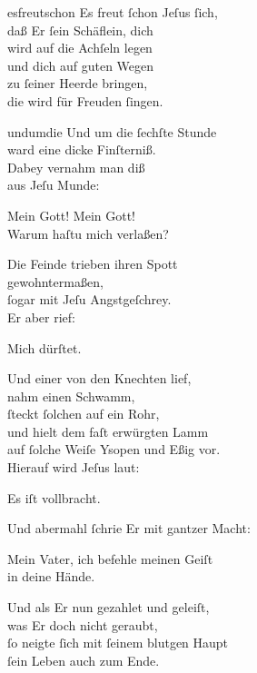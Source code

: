 \documentclass[tocstyle=ref-genre]{ees}
\begin{document}
{\begin{movement}{esfreutschon}
  \voice[Coro]
  Es freut ſchon Jeſus ſich,\\
  daß Er ſein Schäflein, dich\\
  wird auf die Achſeln legen\\
  und dich auf guten Wegen\\
  zu ſeiner Heerde bringen,\\
  die wird für Freuden ſingen.
\end{movement}

\begin{movement}{undumdie}
  Und um die ſechſte Stunde\\
  ward eine dicke Finſterniß.\\
  Dabey vernahm man diß\\
  aus Jeſu Munde:

  Mein Gott! Mein Gott!\\
  Warum haſtu mich verlaßen?

  Die Feinde trieben ihren Spott\\
  gewohntermaßen,\\
  ſogar mit Jeſu Angstgeſchrey.\\
  Er aber rief:

  Mich dürſtet.

  Und einer von den Knechten lief,\\
  nahm einen Schwamm,\\
  ſteckt ſolchen auf ein Rohr,\\
  und hielt dem faſt erwürgten Lamm\\
  auf ſolche Weiſe Ysopen und Eßig vor.\\
  Hierauf wird Jeſus laut:

  Es iſt vollbracht.

  Und abermahl ſchrie Er mit gantzer Macht:

  Mein Vater, ich befehle meinen Geiſt\\
  in deine Hände.

  Und als Er nun gezahlet und geleiſt,\\
  was Er doch nicht geraubt,\\
  ſo neigte ſich mit ſeinem blutgen Haupt\\
  ſein Leben auch zum Ende.
\end{movement}

}
\end{document}
